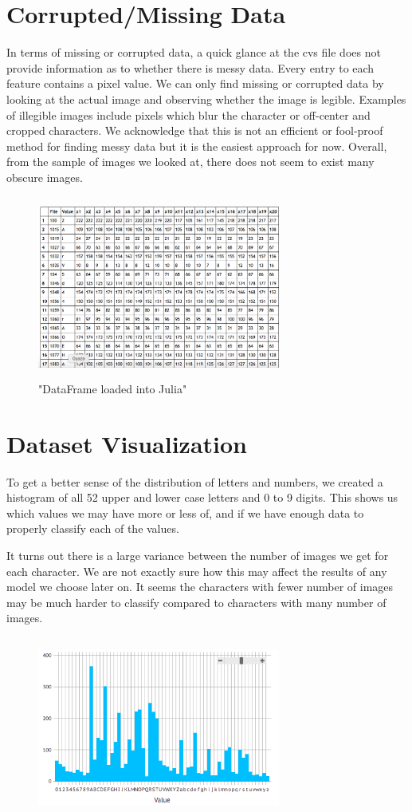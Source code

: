 \documentclass[twocolumn]{article}
\begin{document}
\section{Corrupted/Missing Data}
    In terms of missing or corrupted data, a quick glance at the cvs file does not provide information as to whether there is messy data. Every entry to each feature contains a pixel value. We can only find missing or corrupted data by looking at the actual image and observing whether the image is legible. Examples of illegible images include pixels which blur the character or off-center and cropped characters. We acknowledge that this is not an efficient or fool-proof method for finding messy data but it is the easiest approach for now. Overall, from the sample of images we looked at, there does not seem to exist many obscure images.
    \begin{figure}[ht]
    \includegraphics[width=8cm, height=6cm]{dataframeJulia}
    \caption{"DataFrame loaded into Julia"}
    \vspace{-0.7cm}
    \end{figure}
\section{Dataset Visualization}
    To get a better sense of the distribution of letters and numbers, we created a histogram of all 52 upper and lower case letters and 0 to 9 digits. This shows us which values we may have more or less of, and if we have enough data to properly classify each of the values.
    \par
    It turns out there is a large variance between the number of images we get for each character. We are not exactly sure how this may affect the results of any model we choose later on. It seems the characters with fewer number of images may be much harder to classify compared to characters with many number of images. 
	\begin{figure}[ht]
	\includegraphics[width=8cm, height=6cm]{histogram}
	\end{figure}
\end{document}
